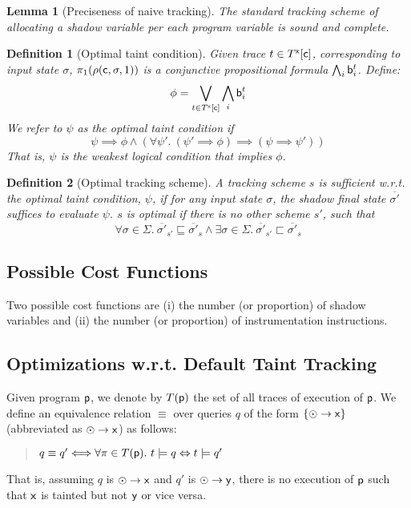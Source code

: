 \documentclass[]{article}
\newtheorem{defn}{Definition}
\newtheorem{lem}{Lemma}
\begin{document}
\begin{lem}[Preciseness of naive tracking] The standard tracking scheme of allocating a shadow variable per each program variable is sound and complete. 
\end{lem}

\begin{defn}[Optimal taint condition] Given trace $t \in T^{\sf x}[{\sf c}]$,
	corresponding to input state $\sigma$, $\pi_1(\rho({\sf c}, \sigma, 1))$ is
	a conjunctive propositional formula $\bigwedge_i {\sf b}^t_i$. Define:
	$$
		\phi = \bigvee_{t \in T^{\sf x}[{\sf c}]} \bigwedge_i {\sf b}^t_i 
	$$
	We refer to $\psi$ as the \emph{optimal taint condition} if
	$$
	\psi \implies \phi \wedge (\forall \psi'.\ (\psi' \implies \phi) \implies (\psi \implies \psi'))
	$$
	That is, $\psi$ is the weakest logical condition that implies $\phi$.
\end{defn}

\begin{defn}[Optimal tracking scheme] A tracking scheme $s$ is \emph{sufficient} w.r.t. the optimal taint condition, $\psi$, if for any input state $\sigma$, the shadow final state $\overline{\sigma'}$ suffices to evaluate $\psi$. $s$ is \emph{optimal} if there is no other scheme $s'$, such that
	$$
	\forall \sigma \in \Sigma.\ \overline{\sigma'}_{s'} \sqsubseteq  \overline{\sigma'}_{s} \wedge \exists \sigma \in \Sigma.\ \overline{\sigma'}_{s'} \sqsubset  \overline{\sigma'}_{s}
	$$
	
\end{defn}

\subsection{Possible Cost Functions}

Two possible cost functions are (i) the number (or proportion) of shadow variables and (ii) the number (or proportion) of instrumentation instructions.

\subsection{Optimizations w.r.t. Default Taint Tracking} 

Given program ${\sf p}$, we denote by $T({\sf p})$ the set of all traces of execution of ${\sf p}$. We define an equivalence relation $\equiv$ over queries $q$ of the form $\{ \odot \rightarrow {\sf x} \}$ (abbreviated as $\odot \rightarrow {\sf x}$) as follows:
\begin{quote}
$q \equiv q'
\Longleftrightarrow \forall \pi \in T({\sf p}).\ t \models q \Leftrightarrow t \models q'$
\end{quote}
That is, assuming $q$ is $\odot \rightarrow {\sf x}$ and $q'$
is $\odot \rightarrow {\sf y}$, there is no execution of ${\sf p}$ such that ${\sf x}$ is tainted but not ${\sf y}$ or vice versa.
 
\end{document}
